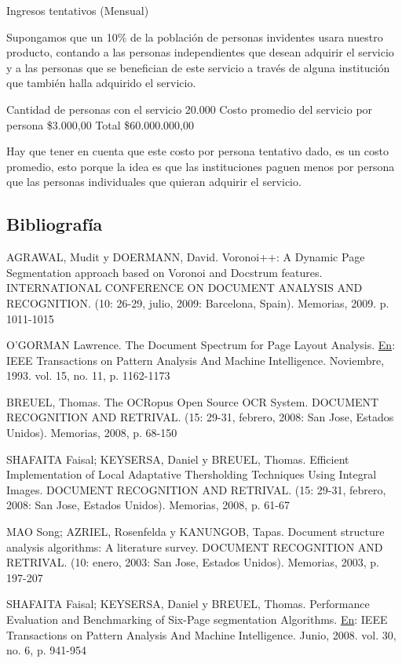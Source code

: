 \documentclass[a4paper, 12pt, oneside]{article}
\begin{document}
Ingresos tentativos (Mensual)

Supongamos que un 10\% de la población de personas invidentes usara nuestro producto, contando a las personas independientes que desean adquirir el servicio y a las personas que se benefician de este servicio a través de alguna institución que también halla adquirido el servicio.

Cantidad de personas con el servicio 20.000
Costo promedio del servicio por persona \$3.000,00
Total \$60.000.000,00

Hay que tener en cuenta que este costo por persona tentativo dado, es un costo promedio, esto porque la idea es que las instituciones paguen menos por persona que las personas individuales que quieran adquirir el servicio.
	
	\clearpage

\clearpage

	\begin{center}
	\section{Bibliografía}
	\end{center}

	AGRAWAL, Mudit y DOERMANN, David. Voronoi++: A Dynamic Page Segmentation approach based on Voronoi and Docstrum features. INTERNATIONAL CONFERENCE ON DOCUMENT ANALYSIS AND RECOGNITION. (10: 26-29, julio, 2009: Barcelona, Spain). Memorias, 2009. p. 1011-1015
	
	O'GORMAN Lawrence. The Document Spectrum for Page Layout Analysis. \underline{En}: IEEE Transactions on Pattern Analysis And Machine Intelligence. Noviembre, 1993. vol. 15, no. 11, p. 1162-1173
	
	BREUEL, Thomas. The OCRopus Open Source OCR System. DOCUMENT RECOGNITION AND RETRIVAL. (15: 29-31, febrero, 2008: San Jose, Estados Unidos). Memorias, 2008, p. 68-150
	
	SHAFAITA Faisal; KEYSERSA, Daniel y BREUEL, Thomas. Efficient Implementation of Local Adaptative Thersholding Techniques Using Integral Images. DOCUMENT RECOGNITION AND RETRIVAL. (15: 29-31, febrero, 2008: San Jose, Estados Unidos). Memorias, 2008, p. 61-67
	
	MAO Song; AZRIEL, Rosenfelda y KANUNGOB, Tapas. Document structure analysis algorithms: A literature survey. DOCUMENT RECOGNITION AND RETRIVAL. (10: enero, 2003: San Jose, Estados Unidos). Memorias, 2003, p. 197-207
	
	SHAFAITA Faisal; KEYSERSA, Daniel y BREUEL, Thomas. Performance Evaluation and Benchmarking of Six-Page segmentation Algorithms. \underline{En}: IEEE Transactions on Pattern Analysis And Machine Intelligence. Junio, 2008. vol. 30, no. 6, p. 941-954
	
\end{document}
